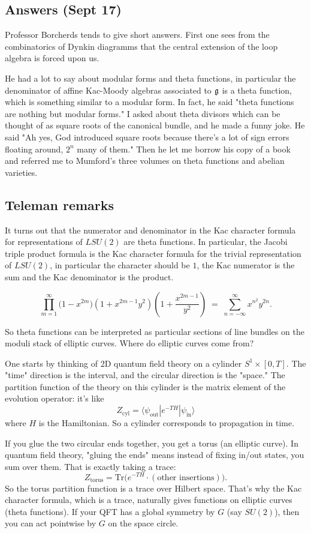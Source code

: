 \documentclass[12pt]{article}
\begin{document}
\subsection*{Answers (Sept 17)}
Professor Borcherds tends to give short answers. First one sees from the combinatorics of Dynkin diagramms that the central extension of the loop algebra is forced upon us.

He had a lot to say about modular forms and theta functions, in particular the denominator of affine Kac-Moody algebras associated to $\mathfrak{g}$ is a theta function, which is something similar to a modular form. In fact, he said "theta functions are nothing but modular forms." I asked about theta divisors which can be thought of as square roots of the canonical bundle, and he made a funny joke. He said "Ah yes, God introduced square roots because there's a lot of sign errors floating around, $2^n$ many of them." Then he let me borrow his copy of a book and referred me to Mumford's three volumes on theta functions and abelian varieties.

\subsection*{Teleman remarks}
It turns out that the numerator and denominator in the Kac character formula for representations of $LSU(2)$ are theta functions. In particular, the Jacobi triple product formula is the Kac character formula for the trivial representation of $LSU(2)$, in particular the character should be $1$, the Kac numerator is the sum and the Kac denominator is the product.

\[
    \prod_{m=1}^\infty
    \bigl(1 - x^{2m}\bigr)
    \left(1 + x^{2m-1} y^2\right)
    \left(1 + \frac{x^{2m-1}}{y^2}\right)
    \;=\;
    \sum_{n=-\infty}^{\infty} x^{n^2} y^{2n}.
\]

So theta functions can be interpreted as particular sections of line bundles on the moduli stack of elliptic curves. Where do elliptic curves come from?

One starts by thinking of 2D quantum field theory on a cylinder $S^1 \times [0,T]$. The "time" direction is the interval, and the circular direction is the "space." The partition function of the theory on this cylinder is the matrix element of the evolution operator: it's like
\[
    Z_{\text{cyl}} = \langle \psi_{\text{out}} | e^{-T H} | \psi_{\text{in}} \rangle
\]
where $H$ is the Hamiltonian. So a cylinder corresponds to propagation in time.

If you glue the two circular ends together, you get a torus (an elliptic curve). In quantum field theory, "gluing the ends" means instead of fixing in/out states, you sum over them. That is exactly taking a trace:
\[
    Z_{\text{torus}} = \mathrm{Tr}\big( e^{-T H}\cdot(\text{other insertions})\big).
\]
So the torus partition function is a trace over Hilbert space. That's why the Kac character formula, which is a trace, naturally gives functions on elliptic curves (theta functions). If your QFT has a global symmetry by $G$ (say $SU(2)$), then you can act pointwise by $G$ on the space circle.
\end{document}
